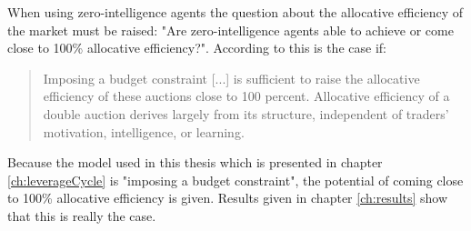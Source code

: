 \documentclass[../Bachelorarbeit.tex]{subfiles}
\begin{document}
\medskip
When using zero-intelligence agents the question about the \gls{allocative efficiency} of the market must be raised: "Are zero-intelligence agents able to achieve or come close to 100\% allocative efficiency?". According to \cite{GodeSunder1993} this is the case if:

\begin{quote}
Imposing a budget constraint [...] is sufficient to raise the allocative efficiency of these auctions close to 100 percent. Allocative efficiency of a double auction derives largely from its structure, independent of traders' motivation, intelligence, or learning.
\end{quote}

Because the model used in this thesis which is presented in chapter \ref{ch:leverageCycle} is "imposing a budget constraint", the potential of coming close to 100\% allocative efficiency is given. Results given in chapter \ref{ch:results} show that this is really the case.
\end{document}
